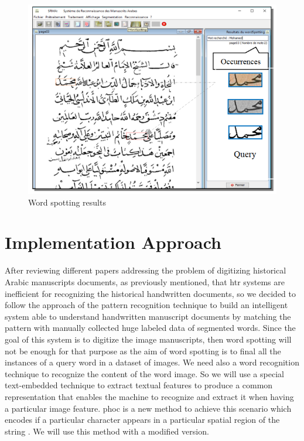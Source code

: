 \begin{itemize}[labelindent=1em,labelsep=0.25cm,leftmargin=*]
        \begin{figure}[!htb]
            \centering
            \includegraphics[width=12cm]{images/noureddine-word-spotting-application.png}
            \caption{Word spotting results}
            \label{fig:noureddine-word-spotting-results}
        \end{figure}

\end{itemize}


\section{Implementation Approach}
After reviewing different papers addressing the problem of digitizing historical Arabic manuscripts documents, as previously mentioned, that \acrshort{htr} systems are inefficient for recognizing the historical handwritten documents, so we decided to follow the approach of the pattern recognition technique to build an intelligent system able to understand handwritten manuscript documents by matching the pattern with manually collected huge labeled data of segmented words. 
Since the goal of this system is to digitize the image manuscripts, then word spotting will not be enough for that purpose as the aim of word spotting is to final all the instances of a query word in a dataset of images. We need also a word recognition technique to recognize the content of the word image. So we will use a special text-embedded technique to extract textual features to produce a common representation that enables the machine to recognize and extract it when having a particular image feature. \acrfull{phoc} is a new method to achieve this scenario which encodes if a particular character appears in a particular spatial region of the string \cite{WORDSPOTTING}. We will use this method with a modified version. \\


